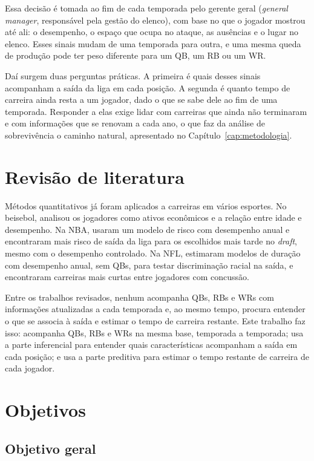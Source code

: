 Essa decisão é tomada ao fim de cada temporada pelo gerente geral (\textit{general manager}, responsável pela gestão do elenco), com base no que o jogador mostrou até ali: o desempenho, o espaço que ocupa no ataque, as ausências e o lugar no elenco. Esses sinais mudam de uma temporada para outra, e uma mesma queda de produção pode ter peso diferente para um QB, um RB ou um WR.

Daí surgem duas perguntas práticas. A primeira é quais desses sinais acompanham a saída da liga em cada posição. A segunda é quanto tempo de carreira ainda resta a um jogador, dado o que se sabe dele ao fim de uma temporada. Responder a elas exige lidar com carreiras que ainda não terminaram e com informações que se renovam a cada ano, o que faz da análise de sobrevivência o caminho natural, apresentado no Capítulo~\ref{cap:metodologia}.


\section{Revisão de literatura}

Métodos quantitativos já foram aplicados a carreiras em vários esportes. No beisebol, \citet{bradbury2010} analisou os jogadores como ativos econômicos e a relação entre idade e desempenho. Na NBA, \citet{staw1995} usaram um modelo de risco com desempenho anual e encontraram mais risco de saída da liga para os escolhidos mais tarde no \textit{draft}, mesmo com o desempenho controlado. Na NFL, \citet{ducking2015} estimaram modelos de duração com desempenho anual, sem QBs, para testar discriminação racial na saída, e \citet{navarro2017} encontraram carreiras mais curtas entre jogadores com concussão.

Entre os trabalhos revisados, nenhum acompanha QBs, RBs e WRs com informações atualizadas a cada temporada e, ao mesmo tempo, procura entender o que se associa à saída e estimar o tempo de carreira restante. Este trabalho faz isso: acompanha QBs, RBs e WRs na mesma base, temporada a temporada; usa a parte inferencial para entender quais características acompanham a saída em cada posição; e usa a parte preditiva para estimar o tempo restante de carreira de cada jogador.


\section{Objetivos}

\subsection*{Objetivo geral}

